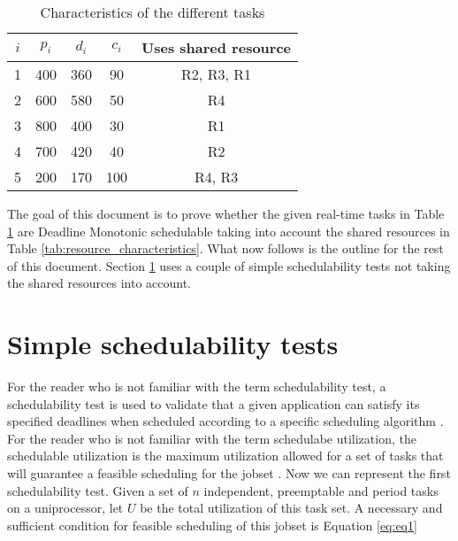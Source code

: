 \documentclass[10pt]{article}
\begin{document}
\begin{table}[H]
    \centering
    \begin{tabular}{|c|c|c|c|c|}
        \hline 
        \textcolor{darkpink}{$i$} & \textcolor{darkpink}{\textit{$p_i$}} & \textcolor{darkpink}{\textit{$d_i$}} & \textcolor{darkpink}{\textit{$c_i$}} & \textcolor{darkpink}{Uses shared resource} \\
        \hline

        1 & 400 & 360 & 90 & R2, R3, R1 \\
        \hline

        2 & 600 & 580 & 50 & R4 \\
        \hline

        3 & 800 & 400 & 30 & R1 \\
        \hline

        4 & 700 & 420 & 40 & R2 \\
        \hline

        5 & 200 & 170 & 100 & R4, R3 \\
        \hline

    \end{tabular}
    
    \caption{Characteristics of the different tasks}
    \label{tab:task_characteristics}
\end{table}

The goal of this document is to prove whether the given real-time tasks in Table \ref{tab:task_characteristics} are Deadline Monotonic schedulable taking into account the shared resources in Table \ref{tab:resource_characteristics}.
What now follows is the outline for the rest of this document.
Section \ref{sec:simple_test} uses a couple of simple schedulability tests not taking the shared resources into account.

\newpage
\section{Simple schedulability tests}
\label{sec:simple_test}

For the reader who is not familiar with the term schedulability test, a schedulability test is used to validate that a given application can satisfy its specified deadlines when scheduled according to a specific scheduling algorithm \cite{cheng}.
For the reader who is not familiar with the term schedulabe utilization, the schedulable utilization is the maximum utilization allowed for a set of tasks that will guarantee a feasible scheduling for the jobset \cite{cheng}.
Now we can represent the first schedulability test.
Given a set of $n$ independent, preemptable and period tasks on a uniprocessor, let $U$ be the total utilization of this task set.
A necessary and sufficient condition for feasible scheduling of this jobset is Equation \ref{eq:eq1}
\end{document}
